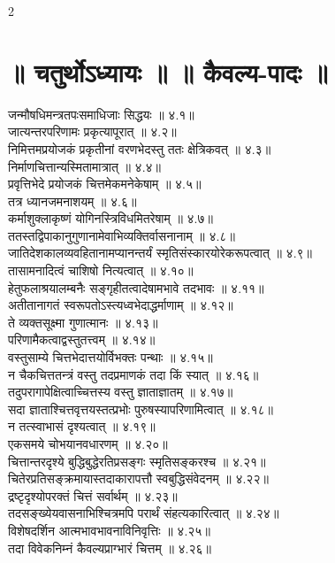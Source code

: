 \documentclass[9pt,a4paper,landscape]{article}
\begin{document}
\begin{multicols}{2}
\section*{॥ चतुर्थोऽध्यायः ॥  ॥ कैवल्य-पादः ॥}
\begin{flushleft}
\devanagarifont
जन्मौषधिमन्त्रतपःसमाधिजाः सिद्धयः ॥ ४.१॥\\
जात्यन्तरपरिणामः प्रकृत्यापूरात् ॥ ४.२॥\\
निमित्तमप्रयोजकं प्रकृतीनां वरणभेदस्तु ततः क्षेत्रिकवत् ॥ ४.३॥\\
निर्माणचित्तान्यस्मितामात्रात् ॥ ४.४॥\\
प्रवृत्तिभेदे प्रयोजकं चित्तमेकमनेकेषाम् ॥ ४.५॥\\
तत्र ध्यानजमनाशयम् ॥ ४.६॥\\
कर्माशुक्लाकृष्णं योगिनस्त्रिविधमितरेषाम् ॥ ४.७॥\\
ततस्तद्विपाकानुगुणानामेवाभिव्यक्तिर्वासनानाम् ॥ ४.८॥\\
जातिदेशकालव्यवहितानामप्यानन्तर्यं स्मृतिसंस्कारयोरेकरूपत्वात् ॥ ४.९॥\\
तासामनादित्वं चाशिषो नित्यत्वात् ॥ ४.१०॥\\
हेतुफलाश्रयालम्बनैः सङ्गृहीतत्वादेषामभावे तदभावः ॥ ४.११॥\\
अतीतानागतं स्वरूपतोऽस्त्यध्वभेदाद्धर्माणाम् ॥ ४.१२॥\\
ते व्यक्तसूक्ष्मा गुणात्मानः ॥ ४.१३॥\\
परिणामैकत्वाद्वस्तुतत्त्वम् ॥ ४.१४॥\\
वस्तुसाम्ये चित्तभेदात्तयोर्विभक्तः पन्थाः ॥ ४.१५॥\\
न चैकचित्ततन्त्रं वस्तु तदप्रमाणकं तदा किं स्यात् ॥ ४.१६॥\\
तदुपरागापेक्षित्वाच्चित्तस्य वस्तु ज्ञाताज्ञातम् ॥ ४.१७॥\\
सदा ज्ञाताश्चित्तवृत्तयस्तत्प्रभोः पुरुषस्यापरिणामित्वात् ॥ ४.१८॥\\
न तत्स्वाभासं दृश्यत्वात् ॥ ४.१९॥\\
एकसमये चोभयानवधारणम् ॥ ४.२०॥\\
चित्तान्तरदृश्ये बुद्धिबुद्धेरतिप्रसङ्गः स्मृतिसङ्करश्च ॥ ४.२१॥\\
चितेरप्रतिसङ्क्रमायास्तदाकारापत्तौ स्वबुद्धिसंवेदनम् ॥ ४.२२॥\\
द्रष्टृदृश्योपरक्तं चित्तं सर्वार्थम् ॥ ४.२३॥\\
तदसङ्ख्येयवासनाभिश्चित्रमपि परार्थं संहत्यकारित्वात् ॥ ४.२४॥\\
विशेषदर्शिन आत्मभावभावनाविनिवृत्तिः ॥ ४.२५॥\\
तदा विवेकनिम्नं कैवल्यप्राग्भारं चित्तम् ॥ ४.२६॥\\

\end{flushleft}
\end{multicols}
\end{document}
